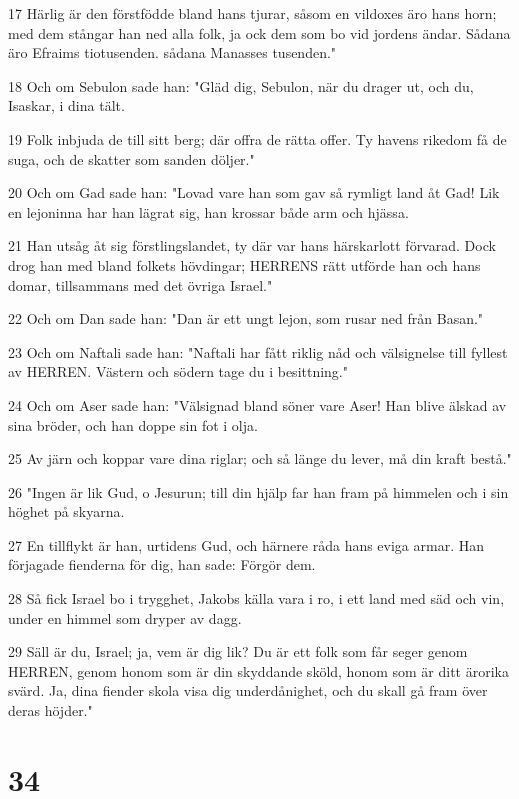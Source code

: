 \par 17 Härlig är den förstfödde bland hans tjurar, såsom en vildoxes äro hans horn; med dem stångar han ned alla folk, ja ock dem som bo vid jordens ändar. Sådana äro Efraims tiotusenden. sådana Manasses tusenden."
\par 18 Och om Sebulon sade han: "Gläd dig, Sebulon, när du drager ut, och du, Isaskar, i dina tält.
\par 19 Folk inbjuda de till sitt berg; där offra de rätta offer. Ty havens rikedom få de suga, och de skatter som sanden döljer."
\par 20 Och om Gad sade han: "Lovad vare han som gav så rymligt land åt Gad! Lik en lejoninna har han lägrat sig, han krossar både arm och hjässa.
\par 21 Han utsåg åt sig förstlingslandet, ty där var hans härskarlott förvarad. Dock drog han med bland folkets hövdingar; HERRENS rätt utförde han och hans domar, tillsammans med det övriga Israel."
\par 22 Och om Dan sade han: "Dan är ett ungt lejon, som rusar ned från Basan."
\par 23 Och om Naftali sade han: "Naftali har fått riklig nåd och välsignelse till fyllest av HERREN. Västern och södern tage du i besittning."
\par 24 Och om Aser sade han: "Välsignad bland söner vare Aser! Han blive älskad av sina bröder, och han doppe sin fot i olja.
\par 25 Av järn och koppar vare dina riglar; och så länge du lever, må din kraft bestå."
\par 26 "Ingen är lik Gud, o Jesurun; till din hjälp far han fram på himmelen och i sin höghet på skyarna.
\par 27 En tillflykt är han, urtidens Gud, och härnere råda hans eviga armar. Han förjagade fienderna för dig, han sade: Förgör dem.
\par 28 Så fick Israel bo i trygghet, Jakobs källa vara i ro, i ett land med säd och vin, under en himmel som dryper av dagg.
\par 29 Säll är du, Israel; ja, vem är dig lik? Du är ett folk som får seger genom HERREN, genom honom som är din skyddande sköld, honom som är ditt ärorika svärd. Ja, dina fiender skola visa dig underdånighet, och du skall gå fram över deras höjder."

\chapter{34}

